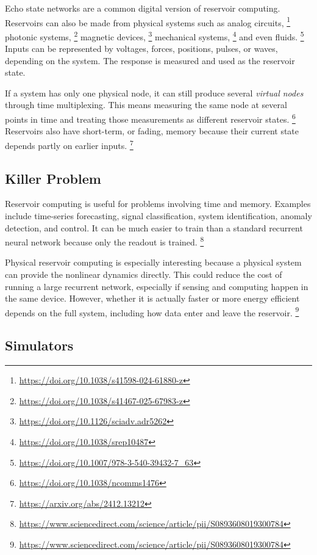 \documentclass{article}
\begin{document}
Echo state networks are a common digital version of reservoir computing. Reservoirs can also be made from physical systems such as analog circuits,
\footnote{\url{https://doi.org/10.1038/s41598-024-61880-z}}
photonic systems,
\footnote{\url{https://doi.org/10.1038/s41467-025-67983-z}}
magnetic devices,
\footnote{\url{https://doi.org/10.1126/sciadv.adr5262}}
mechanical systems,
\footnote{\url{https://doi.org/10.1038/srep10487}}
and even fluids.
\footnote{\url{https://doi.org/10.1007/978-3-540-39432-7_63}}
Inputs can be represented by voltages, forces, positions, pulses, or waves, depending on the system. The response is measured and used as the reservoir state.

If a system has only one physical node, it can still produce several \emph{virtual nodes} through time multiplexing. This means measuring the same node at several points in time and treating those measurements as different reservoir states.
\footnote{\url{https://doi.org/10.1038/ncomms1476}}
Reservoirs also have short-term, or fading, memory because their current state depends partly on earlier inputs.
\footnote{\url{https://arxiv.org/abs/2412.13212}}

\subsection{Killer Problem}

Reservoir computing is useful for problems involving time and memory. Examples include time-series forecasting, signal classification, system identification, anomaly detection, and control. It can be much easier to train than a standard recurrent neural network because only the readout is trained.
\footnote{\url{https://www.sciencedirect.com/science/article/pii/S0893608019300784}}

Physical reservoir computing is especially interesting because a physical system can provide the nonlinear dynamics directly. This could reduce the cost of running a large recurrent network, especially if sensing and computing happen in the same device. However, whether it is actually faster or more energy efficient depends on the full system, including how data enter and leave the reservoir.
\footnote{\url{https://www.sciencedirect.com/science/article/pii/S0893608019300784}}

\subsection{Simulators}
\end{document}
